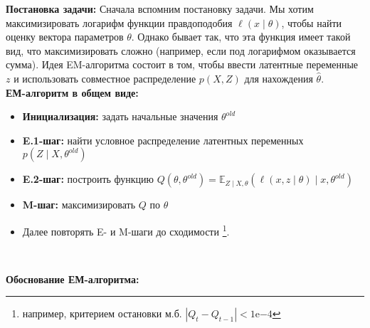 \documentclass[12pt,letterpaper]{article}
\begin{document}
\textbf{Постановка задачи:} 
{
    Сначала вспомним постановку задачи. 
    Мы хотим максимизировать логарифм функции правдоподобия $\ell(x \mid \theta)$, чтобы найти оценку вектора параметров $\theta$. 
    Однако бывает так, что эта функция имеет такой вид, что максимизировать сложно (например, если под логарифмом оказывается сумма). 
    Идея EM-алгоритма состоит в том, чтобы ввести латентные переменные $z$ и использовать совместное распределение $p(X, Z)$ для нахождения $\hat{\theta}$.
}\\

\textbf{ЕМ-алгоритм в общем виде:}
{
    \begin{itemize}
        \item \textbf{Инициализация:} задать начальные значения $\theta^{old}$
        \item \textbf{E.1-шаг:} найти условное распределение латентных переменных $p(Z \mid X, \theta^{old})$
        \item \textbf{E.2-шаг:} построить функцию $Q(\theta, \theta^{old}) = \mathbb{E}_{Z \mid X, \theta}(\ell(x, z \mid \theta) \mid x, \theta^{old})$
        \item \textbf{M-шаг:} максимизировать $Q$ по $\theta$
        \item Далее повторять E- и M-шаги до сходимости \footnote{например, критерием остановки м.б. $|Q_{t} - Q_{t-1}| < 1\mathrm{e}{-4}$}.
    \end{itemize}\\
}
\hypertarget{foo}{\textbf{Обоснование ЕМ-алгоритма:}}
\end{document}
